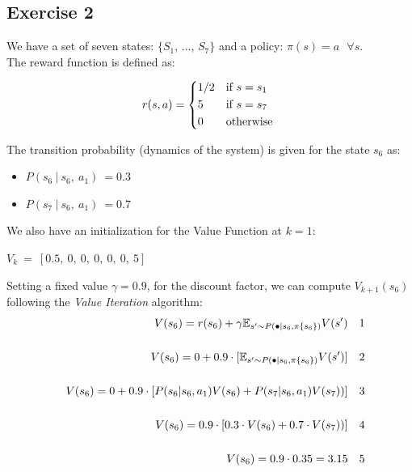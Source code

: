 \documentclass[10pt,a4paper]{article}
\begin{document}
\subsection{Exercise 2}
We have a set of seven states: $\{S_1$, ..., $S_7\}$ and a policy: $\pi(s) = a \:\:\: \forall s$. \\
The reward function is defined as:
\begin{center}
    \begin{equation*}
        r(s,a) =
        \begin{cases*}
            $1/2$   & if $s = s_1$ \\
            $5$     & if $s = s_7$ \\
            $0$     & otherwise \\
        \end{cases*}
    \end{equation*}
\end{center}
\vspace{5pt}
The transition probability (dynamics of the system) is given for the state $s_6$ as:
\begin{itemize}
    \item $P(s_6 \:| \:s_6, \:a_1) \:= 0.3$
    \item $P(s_7 \:| \:s_6, \:a_1) \:= 0.7$ 
\end{itemize}
\vspace{5pt}
We also have an initialization for the Value Function at $k = 1$: 
\vspace{5pt}
\begin{center}
    \begin{math}
        V_k \:= \:[0.5,\:0,\:0,\:0,\:0,\:0,\:5]
    \end{math}
\end{center}
Setting a fixed value $\gamma = 0.9$, for the discount factor, we can compute $V_{k+1}(s_6)$ following the \textit{Value Iteration} algorithm:
\vspace{5pt}
\begin{align}
&& V(s_6) = r(s_6) + \gamma \mathbb{E}_{s' \sim P(\bullet | s_6, \pi\{s_6\})}V(s') \nonumber && 1\\
&& && \notag \\
&&  V(s_6) = 0 + 0.9 \cdot [\mathbb{E}_{s' \sim P(\bullet | s_6, \pi\{s_6\})}V(s')] \nonumber && 2\\ 
&& && \notag  \\
&&  V(s_6) = 0 + 0.9 \cdot [P(s_{6} | s_{6}, a_{1})V(s_{6}) + P(s_{7} | s_{6}, a_{1})V(s_{7}))] \nonumber && 3\\ 
&& && \notag  \\
&&  V(s_6) = 0.9 \cdot [0.3\cdot V(s_{6}) + 0.7 \cdot V(s_{7}))] \nonumber && 4\\ 
&& && \notag  \\
&&  V(s_6) = 0.9 \cdot 0.35 = 3.15 \nonumber && 5
\end{align}
\end{document}

